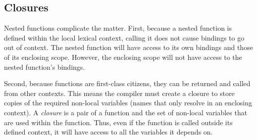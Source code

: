 \subsection{Closures}
Nested functions complicate the matter. First, because a nested function is defined within the local lexical context, calling it does not cause bindings to go out of context. The nested function will have access to its own bindings and those of its enclosing scope. However, the enclosing scope will not have access to the nested function's bindings.

Second, because functions are first-class citizens, they can be returned and called from other contexts. This means the compiler must create a closure to store copies of the required non-local variables (names that only resolve in an enclosing context). A \textit{closure} is a pair of a function and the set of non-local variables that are used within the function. Thus, even if the function is called outside its defined context, it will have access to all the variables it depends on.
